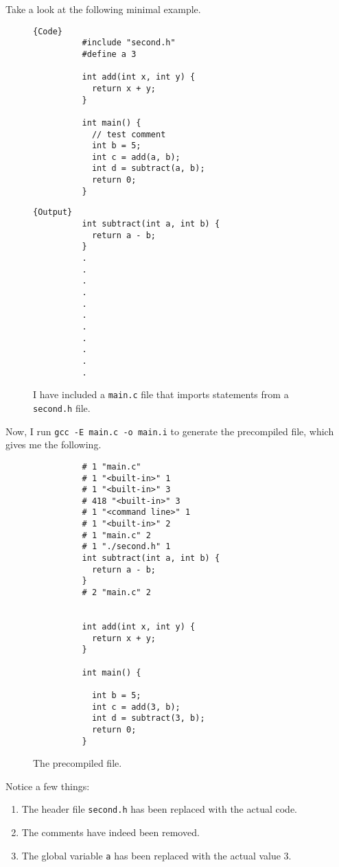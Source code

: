     \begin{example}
      Take a look at the following minimal example. 
      \begin{figure}[H]
        \centering 
        \noindent\begin{minipage}{.5\textwidth}
        \begin{lstlisting}[]{Code}
          #include "second.h"
          #define a 3

          int add(int x, int y) {
            return x + y;
          }

          int main() {
            // test comment
            int b = 5; 
            int c = add(a, b);
            int d = subtract(a, b); 
            return 0; 
          }
        \end{lstlisting}
        \end{minipage}
        \hfill
        \begin{minipage}{.49\textwidth}
        \begin{lstlisting}[]{Output}
          int subtract(int a, int b) {
            return a - b; 
          }
          .
          .
          .
          .
          .
          .
          .
          .
          .
          .
          .
        \end{lstlisting}
        \end{minipage}
        \caption{I have included a \texttt{main.c} file that imports statements from a \texttt{second.h} file.} 
        \label{fig:precompile_example}
      \end{figure}
      Now, I run \texttt{gcc -E main.c -o main.i} to generate the precompiled file, which gives me the following. 
      \begin{figure}[H]
        \centering 
        \begin{lstlisting}
          # 1 "main.c"
          # 1 "<built-in>" 1
          # 1 "<built-in>" 3
          # 418 "<built-in>" 3
          # 1 "<command line>" 1
          # 1 "<built-in>" 2
          # 1 "main.c" 2
          # 1 "./second.h" 1
          int subtract(int a, int b) {
            return a - b;
          }
          # 2 "main.c" 2


          int add(int x, int y) {
            return x + y;
          }

          int main() {

            int b = 5;
            int c = add(3, b);
            int d = subtract(3, b);
            return 0;
          }
        \end{lstlisting}
        \caption{The precompiled file. } 
        \label{fig:precompiled_file}
      \end{figure}
      Notice a few things: 
      \begin{enumerate}
        \item The header file \texttt{second.h} has been replaced with the actual code.
        \item The comments have indeed been removed. 
        \item The global variable \texttt{a} has been replaced with the actual value 3. 
      \end{enumerate}
    \end{example}


